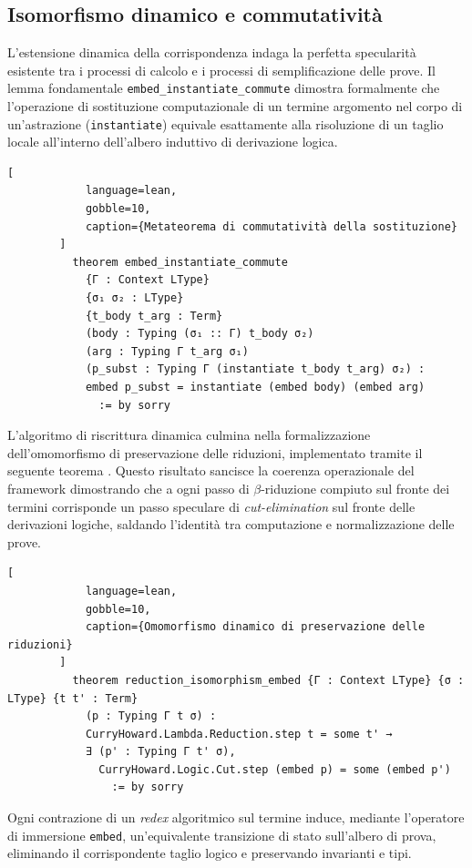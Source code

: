 \subsection{Isomorfismo dinamico e commutatività}
L'estensione dinamica della corrispondenza indaga la perfetta specularità esistente tra i processi di calcolo e i processi di semplificazione delle prove. Il lemma fondamentale \texttt{embed\_instantiate\_commute} 
dimostra formalmente che l'operazione di sostituzione computazionale di un termine argomento nel corpo di un'astrazione (\texttt{instantiate}) equivale esattamente alla risoluzione di un taglio locale all'interno dell'albero 
induttivo di derivazione logica.
\begin{center}
    \begin{minipage}{\textwidth}
        \begin{lstlisting}[
            language=lean, 
            gobble=10,
            caption={Metateorema di commutatività della sostituzione}
        ]
          theorem embed_instantiate_commute 
            {Γ : Context LType} 
            {σ₁ σ₂ : LType} 
            {t_body t_arg : Term}
            (body : Typing (σ₁ :: Γ) t_body σ₂) 
            (arg : Typing Γ t_arg σ₁)
            (p_subst : Typing Γ (instantiate t_body t_arg) σ₂) :
            embed p_subst = instantiate (embed body) (embed arg) 
              := by sorry
        \end{lstlisting}
    \end{minipage}
\end{center}
L'algoritmo di riscrittura dinamica culmina nella formalizzazione dell'omomorfismo di preservazione delle riduzioni, implementato tramite il seguente teorema . Questo risultato sancisce la coerenza operazionale 
del framework dimostrando che a ogni passo di $\beta$-riduzione compiuto sul fronte dei termini corrisponde un passo speculare di \emph{cut-elimination} sul fronte delle derivazioni logiche, saldando l'identità 
tra computazione e normalizzazione delle prove.
\begin{center}
    \begin{minipage}{\textwidth}
        \begin{lstlisting}[
            language=lean, 
            gobble=10,
            caption={Omomorfismo dinamico di preservazione delle riduzioni}
        ]
          theorem reduction_isomorphism_embed {Γ : Context LType} {σ : LType} {t t' : Term}
            (p : Typing Γ t σ) :
            CurryHoward.Lambda.Reduction.step t = some t' →
            ∃ (p' : Typing Γ t' σ), 
              CurryHoward.Logic.Cut.step (embed p) = some (embed p') 
                := by sorry
        \end{lstlisting}
    \end{minipage}
\end{center}
Ogni contrazione di un \emph{redex} algoritmico sul termine induce, mediante l'operatore di immersione \texttt{embed}, un'equivalente transizione di stato sull'albero di prova, eliminando il corrispondente taglio logico e preservando invarianti e tipi.

